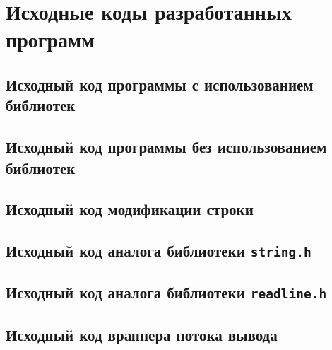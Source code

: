 \section{Исходные коды разработанных программ}

\subsection{Исходный код программы с использованием библиотек}


\subsection{Исходный код программы без использованием библиотек}


\subsection{Исходный код модификации строки}



\subsection{Исходный код аналога библиотеки \texttt{string.h}}



\subsection{Исходный код аналога библиотеки \texttt{readline.h}}



\subsection{Исходный код враппера потока вывода}


